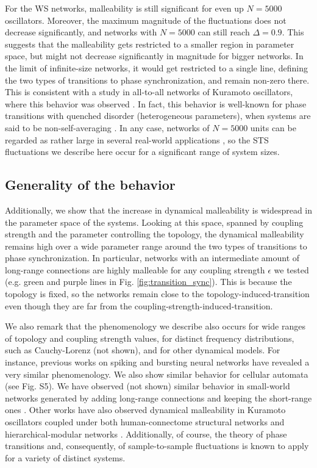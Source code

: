 For the WS networks, malleability is still significant for even up $N = 5000$ oscillators. Moreover, the maximum magnitude of the fluctuations does not decrease significantly, and networks with $N = 5000$ can still reach $\Delta = 0.9$. This suggests that the malleability gets restricted to a smaller region in parameter space, but might not decrease significantly in magnitude for bigger networks. In the limit of infinite-size networks, it would get restricted to a single line, defining the two types of transitions to phase synchronization, and remain non-zero there. This is consistent with a study in all-to-all networks of Kuramoto oscillators, where this behavior was observed \cite{hong2006anomalous}. In fact, this behavior is well-known for phase transitions with quenched disorder (heterogeneous parameters), when systems are said to be non-self-averaging \cite{wiseman1995lack}.  
In any case, networks of $N = 5000$ units can be regarded as rather large in several real-world applications \cite{peter2018transition}, so the STS fluctuations we describe here occur for a significant range of system sizes.

\subsection*{Generality of the behavior}
Additionally, we show that the increase in dynamical malleability is widespread in the parameter space of the systems. Looking at this space, spanned by coupling strength and the parameter controlling the topology, the dynamical malleability remains high over a wide parameter range around the two types of transitions to phase synchronization. In particular, networks with an intermediate amount of long-range connections are highly malleable for any coupling strength $\epsilon$ we tested (e.g. green and purple lines in Fig. \ref{fig:transition_sync}). This is because the topology is fixed, so the networks remain close to the topology-induced-transition even though they are far from the coupling-strength-induced-transition. 

We also remark that the phenomenology we describe also occurs for wide ranges of topology and coupling strength values, for distinct frequency distributions, such as Cauchy-Lorenz (not shown), and for other dynamical models. For instance, previous works on spiking \cite{budzinski2020synchronization} and bursting \cite{budzinski2019synchronous} neural networks have revealed a very similar phenomenology. We also show similar behavior for cellular automata (see Fig. S5). We have observed (not shown) similar behavior in small-world networks generated by adding long-range connections and keeping the short-range ones \cite{newman1999scaling}. Other works have also observed dynamical malleability in Kuramoto oscillators coupled under both human-connectome structural networks and hierarchical-modular networks \cite{buendia2022the, villegas2014frustrated}. 
Additionally, of course, the theory of phase transitions and, consequently, of sample-to-sample fluctuations is known to apply for a variety of distinct systems. 

